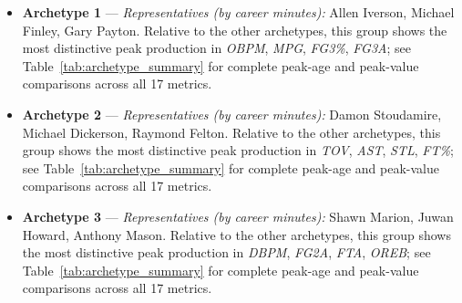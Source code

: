 \begin{itemize}
\item \textbf{Archetype 1} --- \emph{Representatives (by career minutes):} Allen Iverson, Michael Finley, Gary Payton. Relative to the other archetypes, this group shows the most distinctive peak production in \textit{OBPM}, \textit{MPG}, \textit{FG3\%}, \textit{FG3A}; see Table~\ref{tab:archetype_summary} for complete peak-age and peak-value comparisons across all 17 metrics.
\item \textbf{Archetype 2} --- \emph{Representatives (by career minutes):} Damon Stoudamire, Michael Dickerson, Raymond Felton. Relative to the other archetypes, this group shows the most distinctive peak production in \textit{TOV}, \textit{AST}, \textit{STL}, \textit{FT\%}; see Table~\ref{tab:archetype_summary} for complete peak-age and peak-value comparisons across all 17 metrics.
\item \textbf{Archetype 3} --- \emph{Representatives (by career minutes):} Shawn Marion, Juwan Howard, Anthony Mason. Relative to the other archetypes, this group shows the most distinctive peak production in \textit{DBPM}, \textit{FG2A}, \textit{FTA}, \textit{OREB}; see Table~\ref{tab:archetype_summary} for complete peak-age and peak-value comparisons across all 17 metrics.
\end{itemize}
